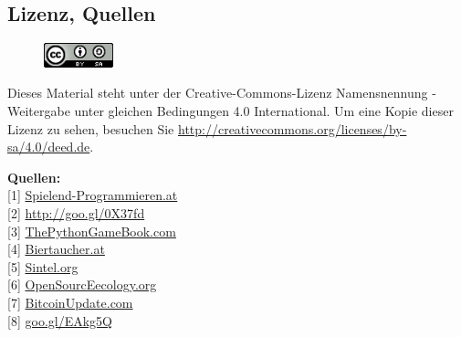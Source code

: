 \subsection*{Lizenz, Quellen} 
\begin{figure}
\includegraphics[width=2cm]{editoral/ccbysa88x31.png}
\end{figure}
Dieses Material steht unter der Creative-Commons-Lizenz Namensnennung - Weitergabe unter gleichen Bedingungen 4.0 International. Um eine Kopie dieser Lizenz zu sehen, besuchen Sie \url{http://creativecommons.org/licenses/by-sa/4.0/deed.de}.

\textbf{Quellen:} \\
{[}1{]} \href{http://spielend-programmieren.at}{Spielend-Programmieren.at} \\
{[}2{]} \href{http://spielend-programmieren.at/de:tutorials:start}{http://goo.gl/0X37fd} \\
{[}3{]} \href{http://thepythongamebook.com}{ThePythonGameBook.com} \\
{[}4{]} \href{http://biertaucher.at}{Biertaucher.at} \\
{[}5{]} \href{http://www.sintel.org/}{Sintel.org} \\
{[}6{]} \href{http://opensourceecology.org/}{OpenSourcEecology.org} \\
{[}7{]} \href{http://www.bitcoinupdate.com/}{BitcoinUpdate.com} \\
{[}8{]} \href{http://www.amazon.de/gp/product/1449388396/ref=as_li_ss_tl?ie=UTF8&camp=1638&creative=19454&creativeASIN=1449388396&linkCode=as2&tag=spielendprogr-21}{goo.gl/EAkg5Q} \\










